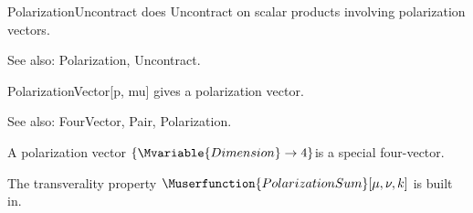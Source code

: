 






PolarizationUncontract does Uncontract on scalar products involving polarization vectors.

See also:  Polarization, Uncontract.



PolarizationVector[p, mu] gives a polarization vector.

See also: FourVector, Pair, Polarization.






A polarization vector \(\{\Mvariable{Dimension}\rightarrow 4\}\)is a special four-vector.



The transverality property \(\Muserfunction{PolarizationSum}[\mu ,\nu ,k]\) is built in.




